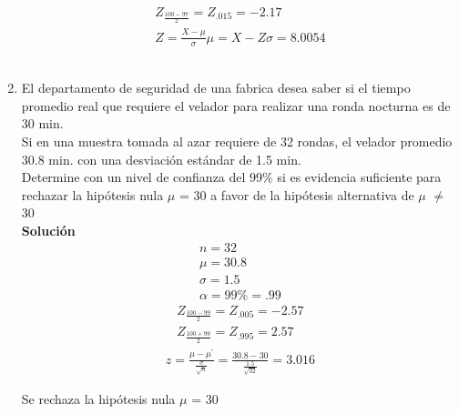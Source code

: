 \begin{enumerate}
    \begin{gather*}	 
    Z_{\frac{100 - 97}{2}} = Z_{.015} = -2.17\\
    Z = \frac{X -\mu}{\sigma}
    \mu = X - Z\sigma = 8.0054
    \end{gather*}\\
    \item El departamento de seguridad de una fabrica desea saber si el tiempo promedio real que requiere el velador para realizar una ronda nocturna es de 30 min.\\
    Si en una muestra tomada al azar requiere de 32 rondas, el velador promedio 30.8 min. con una desviación estándar de 1.5 min.\\
    Determine con un nivel de confianza del 99\% si es evidencia suficiente para rechazar la hipótesis nula $\mu$ = 30 a favor de la hipótesis alternativa de $\mu$ $\neq$ 30
    \\\textbf{Solución}
    \begin{gather*}
    n	= 32\\
    \mu = 30.8\\
    \sigma = 1.5\\
    \alpha = 99\% = .99
    \end{gather*}
    \begin{gather*}	 
    Z_{\frac{100 - 99}{2}} = Z_{.005} = -2.57\\
    Z_{\frac{100 + 99}{2}} = Z_{.995} = 2.57
    \end{gather*}
    \begin{gather*}	 
    z = \frac{\mu - \mu^{'}}{\frac{\sigma}{\sqrt{n}}} = \frac{30.8 - 30}{\frac{1.5}{\sqrt{32}}} = 3.016
    \end{gather*}
    \begin{center}
         Se rechaza la hipótesis nula $\mu$ = 30
    \end{center}
    

\end{enumerate}
